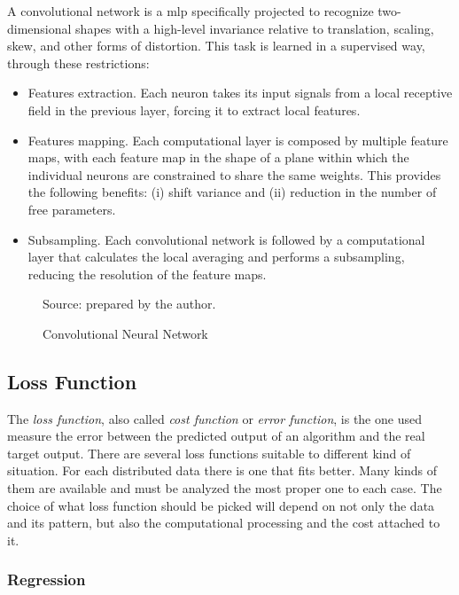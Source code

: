 A convolutional network is a \gls*{mlp} specifically projected to recognize two-dimensional shapes with a high-level invariance relative to translation, scaling, skew, and other forms of distortion. This task is learned in a supervised way, through these restrictions:
%
\begin{itemize}
    \item Features extraction. Each neuron takes its input signals from a local receptive field in the previous layer, forcing it to extract local features.
    \item Features mapping. Each computational layer is composed by multiple feature maps, with each feature map in the shape of a plane within which the individual neurons are constrained to share the same weights. This provides the following benefits: (i) shift variance and (ii) reduction in the number of free parameters.
    \item Subsampling. Each convolutional network is followed by a computational layer that calculates the local averaging and performs a subsampling, reducing the resolution of the feature maps.
\end{itemize}
%
\begin{figure}[!htb]\scriptsize
    \centering
    \caption{Convolutional Neural Network}
    
    \begin{flushleft}\footnotesize
        Source: prepared by the author.
    \end{flushleft}
\end{figure}

\subsection{Loss Function}\label{sec:loss_function}

The \emph{loss function}, also called \emph{cost function} or \emph{error function}, is the one used measure the error between the predicted output of an algorithm and the real target output. 
There are several loss functions suitable to different kind of situation. 
For each distributed data there is one that fits better.
Many kinds of them are available and must be analyzed the most proper one to each case. 
The choice of what loss function should be picked will depend on not only the data and its pattern, but also the computational processing and the cost attached to it.

\subsubsection*{Regression}

